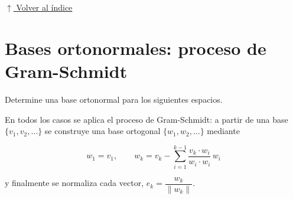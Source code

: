 \documentclass[12pt]{article}
\newcommand{\volverindice}{%
    \vspace{1em}%
    \begin{flushright}%
        \hyperlink{indice}{\small $\uparrow$ Volver al índice}%
    \end{flushright}%
}
\begin{document}
\volverindice
\newpage


\section{Bases ortonormales: proceso de Gram-Schmidt}

Determine una base ortonormal para los siguientes espacios.

En todos los casos se aplica el proceso de Gram-Schmidt: a partir de una
base $\{v_1,v_2,\dots\}$ se construye una base ortogonal
$\{w_1,w_2,\dots\}$ mediante

\[
w_1=v_1,\qquad
w_k=v_k-\sum_{i=1}^{k-1}\frac{v_k\cdot w_i}{w_i\cdot w_i}\,w_i
\]

y finalmente se normaliza cada vector, $e_k=\dfrac{w_k}{\|w_k\|}$.
\end{document}
